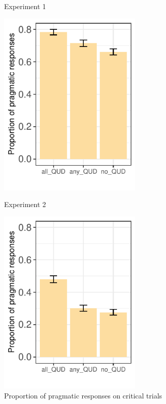 \documentclass[12pt]{article}
\begin{document}
\begin{figure}[!ht]  
    \begin{minipage}{.5\textwidth}
        \caption*{Experiment 1}
        \includegraphics[height=9cm]{img/exp1_proportion_pragmatic.pdf}   
        \end{minipage}%
    \begin{minipage}{.5\textwidth}
        \caption*{Experiment 2}
        \includegraphics[height=9cm]{img/exp2_proportion_pragmatic.pdf}
        \end{minipage}%
        \caption{Proportion of pragmatic responses on critical trials}
    \end{figure}
\end{document}
